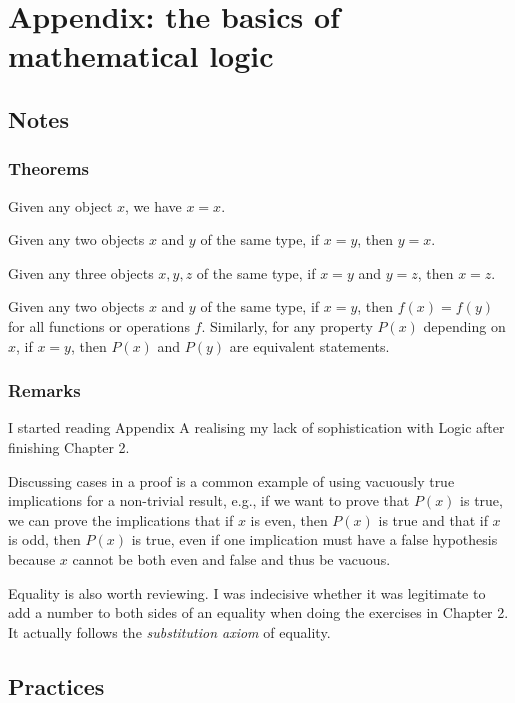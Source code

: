 \section{Appendix: the basics of mathematical logic}
\subsection{Notes}
\subsubsection{Theorems}
\begin{axiom}
    Given any object $x$, we have $x = x$.
\end{axiom}
\begin{axiom}
    Given any two objects $x$ and $y$ of the same
type, if $x = y$, then $y = x$.
\end{axiom}
\begin{axiom}
    Given any three objects $x, y, z$ of the same
type, if $x = y$ and $y = z$, then $x = z$.
\end{axiom}
\begin{axiom}
    Given any two objects $x$ and $y$ of the same type, if $x = y$, then $f(x) = f(y)$ for all functions or operations $f$. Similarly, for any property $P(x)$ depending on $x$, if $x = y$, then $P(x)$ and $P(y)$ are equivalent statements.    
\end{axiom}

\subsubsection{Remarks}
I started reading Appendix A realising my lack of sophistication with Logic after finishing Chapter 2.

Discussing cases in a proof is a common example of using vacuously true implications for a non-trivial result, e.g., if we want to prove that $P(x)$ is true, we can prove the implications that if $x$ is even, then $P(x)$ is true and that if $x$ is odd, then $P(x)$ is true, even if one implication must have a false hypothesis because $x$ cannot be both even and false and thus be vacuous.

Equality is also worth reviewing. I was indecisive whether it was legitimate to add a number to both sides of an equality when doing the exercises in Chapter 2. It actually follows the \emph{substitution axiom} of equality.

\subsection{Practices}
